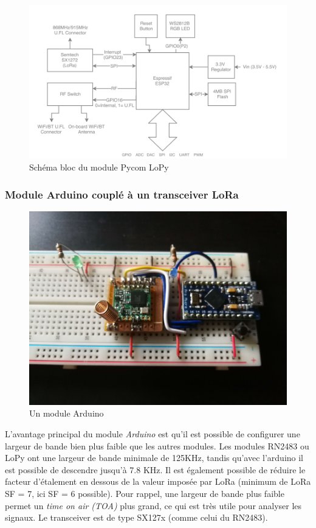 \newpage

\begin{figure}[h]
\centering

\includegraphics[scale=1]{images/SBlopy.png}
\caption{Schéma bloc du module Pycom LoPy}\label{term3003}
\end{figure}

\subsubsection{Module Arduino couplé à un transceiver LoRa}\label{arduino}

\begin{figure}[h]
\centering

\includegraphics[scale=0.07]{images/arduino.png}
\caption{Un module Arduino}\label{term36}
\end{figure}

L'avantage principal du module \textit{Arduino} est qu'il est possible de configurer une largeur de bande bien plus faible que les autres modules. Les modules RN2483 ou LoPy ont une largeur de bande minimale de 125KHz, tandis qu'avec l'arduino il est possible de descendre jusqu'à 7.8 KHz. Il est également possible de réduire le facteur d'étalement en dessous de la valeur imposée par LoRa (minimum de LoRa SF = 7, ici SF = 6 possible). Pour rappel, une largeur de bande plus faible permet un \textit{time on air (TOA)} plus grand, ce qui est très utile pour analyser les signaux. Le transceiver est de type SX127x (comme celui du RN2483).

